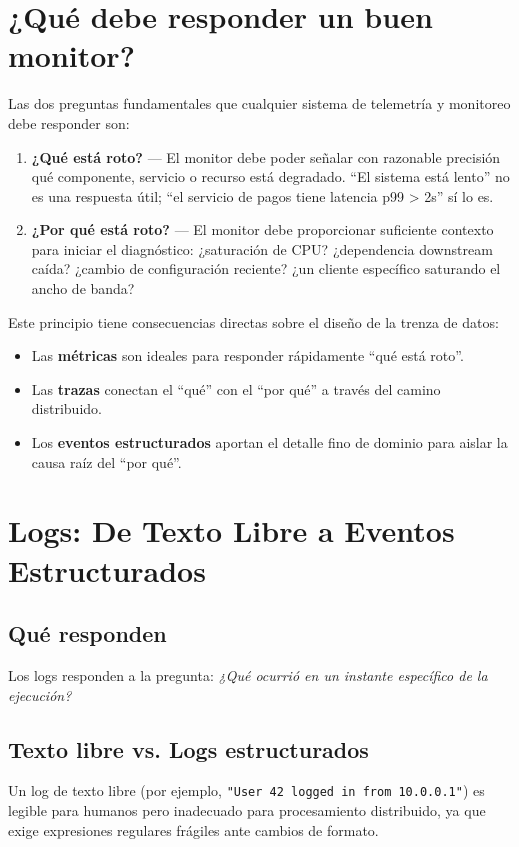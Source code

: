 \documentclass[variant=apuntes,cover=institutional,mode=screen]{ua-engineering-v6-article}
\begin{document}
\section{¿Qué debe responder un buen monitor?}

Las dos preguntas fundamentales que cualquier sistema de telemetría y monitoreo debe responder son:

\begin{enumerate}
\item \textbf{¿Qué está roto?} --- El monitor debe poder señalar con razonable
precisión qué componente, servicio o recurso está degradado. ``El sistema está
lento'' no es una respuesta útil; ``el servicio de pagos tiene latencia p99 > 2s''
sí lo es.

\item \textbf{¿Por qué está roto?} --- El monitor debe proporcionar suficiente
contexto para iniciar el diagnóstico: ¿saturación de CPU? ¿dependencia downstream caída? ¿cambio
de configuración reciente? ¿un cliente específico saturando el ancho de banda?
\end{enumerate}

Este principio tiene consecuencias directas sobre el diseño de la trenza de datos:
\begin{itemize}
\item Las \textbf{métricas} son ideales para responder rápidamente ``qué está roto''.
\item Las \textbf{trazas} conectan el ``qué'' con el ``por qué'' a través del camino distribuido.
\item Los \textbf{eventos estructurados} aportan el detalle fino de dominio para aislar la causa raíz del ``por qué''.
\end{itemize}

\section{Logs: De Texto Libre a Eventos Estructurados}

\subsection{Qué responden}
Los logs responden a la pregunta: \emph{¿Qué ocurrió en un instante específico de la ejecución?}

\subsection{Texto libre vs. Logs estructurados}
Un log de texto libre (por ejemplo, \texttt{"User 42 logged in from 10.0.0.1"}) es legible para humanos pero inadecuado para procesamiento distribuido, ya que exige expresiones regulares frágiles ante cambios de formato.
\end{document}
